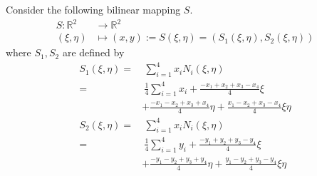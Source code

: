 \documentclass[a4paper]{article}
\numberwithin{equation}{section}
\begin{document}
Consider the following bilinear mapping $S$.
\begin{align}
S:{\mathbb{R}^2} &\to {\mathbb{R}^2}\\
\left( {\xi ,\eta } \right) &\mapsto \left( {x,y} \right) := S\left( {\xi ,\eta } \right) = \left( {{S_1}\left( {\xi ,\eta } \right),{S_2}\left( {\xi ,\eta } \right)} \right)
\end{align}
where $S_1,S_2$ are defined by
\begin{align}
{S_1}\left( {\xi ,\eta } \right) =&\ \sum\limits_{i = 1}^4 {{x_i}{N_i}\left( {\xi ,\eta } \right)} \\
 =&\ \frac{1}{4}\sum\limits_{i = 1}^4 {{x_i}}  + \frac{{ - {x_1} + {x_2} + {x_3} - {x_4}}}{4}\xi \\
& + \frac{{ - {x_1} - {x_2} + {x_3} + {x_4}}}{4}\eta  + \frac{{{x_1} - {x_2} + {x_3} - {x_4}}}{4}\xi \eta \\
{S_2}\left( {\xi ,\eta } \right)=&\ \sum\limits_{i = 1}^4 {{x_i}{N_i}\left( {\xi ,\eta } \right)} \\
=&\ \frac{1}{4}\sum\limits_{i = 1}^4 {{y_i}}  + \frac{{ - {y_1} + {y_2} + {y_3} - {y_4}}}{4}\xi \\
& + \frac{{ - {y_1} - {y_2} + {y_3} + {y_4}}}{4}\eta  + \frac{{{y_1} - {y_2} + {y_3} - {y_4}}}{4}\xi \eta 
\end{align}
\end{document}
